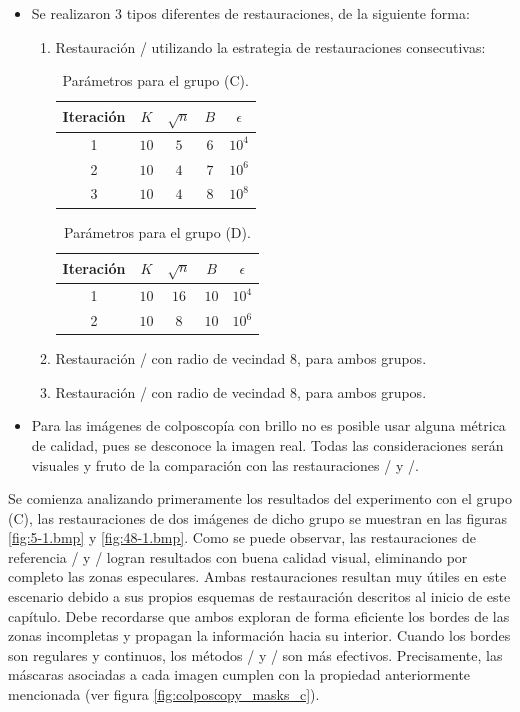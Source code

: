 \begin{itemize}
	\item Se realizaron 3 tipos diferentes de restauraciones, de la siguiente forma:
	\begin{enumerate}
		\item Restauraci\'on \SOP/ utilizando la estrategia de restauraciones consecutivas:
		\begin{table}[H]
			\centering
			\begin{tabular}{|c|cccc|}
				\hline
				Iteraci\'on & $K$ & $\sqrt{n}$ & $B$ & $\epsilon$ \\\hline
				1 & $10$ & $5$ & $6$ & $10^4$\\
				2 & $10$ & $4$ & $7$ & $10^6$\\
				3 & $10$ & $4$ & $8$ & $10^8$\\\hline
			\end{tabular}
			\caption{Par\'ametros para el grupo (C).}
			\label{tab:params_c}
		\end{table}
		\begin{table}[H]
			\centering
			\begin{tabular}{|c|cccc|}
				\hline
				Iteraci\'on & $K$ & $\sqrt{n}$ & $B$ & $\epsilon$ \\\hline
				1 & $10$ & $16$ & $10$ & $10^4$\\
				2 & $10$ & $8$ & $10$ & $10^6$\\\hline
			\end{tabular}
			\caption{Par\'ametros para el grupo (D).}
		\end{table}
		\item Restauraci\'on \TELEA/ con radio de vecindad $8$, para ambos grupos.
		\item Restauraci\'on \NS/ con radio de vecindad $8$, para ambos grupos.
	\end{enumerate}
	\item Para las im\'agenes de colposcop\'ia con brillo no es posible usar alguna m\'etrica de calidad, pues se desconoce la imagen real. Todas las consideraciones ser\'an visuales y fruto de la comparaci\'on con las restauraciones \TELEA/ y \NS/.  
\end{itemize}

\qquad

Se comienza analizando primeramente los resultados del experimento con el grupo (C), las restauraciones de dos im\'agenes de dicho grupo se muestran en las figuras \ref{fig:5-1.bmp} y \ref{fig:48-1.bmp}. Como se puede observar, las restauraciones de referencia \TELEA/ y \NS/ logran resultados con buena calidad visual, eliminando por completo las zonas especulares. Ambas restauraciones resultan muy \'utiles en este escenario debido a sus propios esquemas de restauraci\'on descritos al inicio de este cap\'itulo. Debe recordarse que ambos exploran de forma eficiente los bordes de las zonas incompletas y propagan la información hacia su interior. Cuando los bordes son regulares y continuos, los m\'etodos \TELEA/ y \NS/ son m\'as efectivos. Precisamente, las m\'ascaras asociadas a cada imagen cumplen con la propiedad anteriormente mencionada (ver figura \ref{fig:colposcopy_masks_c}).

